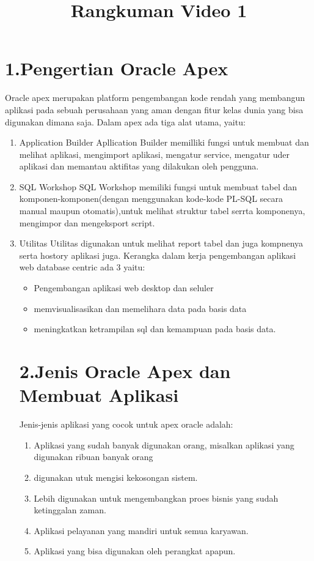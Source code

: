 \clearpage
\setcounter{page}{1}

\begin{center}
\title{\LARGE \bf Rangkuman Video 1}
\end{center}

\section*{\normalsize 1.Pengertian Oracle Apex} 
\hspace {\parindent}Oracle apex merupakan platform pengembangan kode rendah yang membangun aplikasi pada sebuah perusahaan yang aman dengan fitur kelas dunia yang bisa digunakan dimana saja.
\hspace {\parindent}Dalam apex ada tiga alat utama, yaitu:
\begin{enumerate}
\item Application Builder
Apllication Builder memilliki fungsi untuk membuat dan melihat aplikasi, mengimport aplikasi, mengatur service, mengatur uder aplikasi dan memantau aktifitas yang dilakukan oleh pengguna.
\item SQL Workshop
SQL Workshop memiliki fungsi untuk membuat tabel dan komponen-komponen(dengan menggunakan kode-kode PL-SQL secara manual maupun otomatis),untuk melihat struktur tabel serrta komponenya, mengimpor dan mengeksport script.
\item Utilitas 
Utilitas digunakan untuk melihat report tabel dan juga kompnenya serta hostory aplikasi juga. Kerangka dalam kerja pengembangan aplikasi web database centric ada 3 yaitu:
\begin{itemize}
\item Pengembangan aplikasi web desktop dan seluler
\item memvisualisasikan dan memelihara data pada basis data
\item meningkatkan ketrampilan sql dan kemampuan pada basis data.
\end{itemize}

\section*{\normalsize 2.Jenis Oracle Apex dan Membuat Aplikasi}
Jenis-jenis aplikasi yang cocok untuk apex oracle adalah: 
\begin{enumerate}
\item Aplikasi yang sudah banyak digunakan orang, misalkan aplikasi yang digunakan ribuan banyak orang
\item digunakan utuk mengisi kekosongan sistem.
\item Lebih digunakan untuk mengembangkan proes bisnis yang sudah ketinggalan zaman.
\item Aplikasi pelayanan yang mandiri untuk semua karyawan.
\item Aplikasi yang bisa digunakan oleh perangkat apapun.
\end{enumerate}


\end{enumerate}
